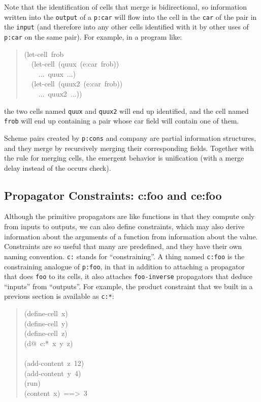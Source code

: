 \documentclass[12pt,letterpaper,english]{article}
\begin{document}
Note that the identification of cells that merge is bidirectional, so
information written into the \texttt{output} of a \texttt{p:car} will flow into
the cell in the \texttt{car} of the pair in the \texttt{input} (and therefore
into any other cells identified with it by other uses of \texttt{p:car} on
the same pair).  For example, in a program like:
\begin{quote}{\ttfamily \raggedright \noindent
(let-cell~frob~\\
~~(let-cell~(quux~(e:car~frob))~\\
~~~~...~quux~...)~\\
~~(let-cell~(quux2~(e:car~frob))~\\
~~~~...~quux2~...))
}\end{quote}
the two cells named \texttt{quux} and \texttt{quux2} will end up identified, and
the cell named \texttt{frob} will end up containing a pair whose car field
will contain one of them.

Scheme pairs created by \texttt{p:cons} and company are partial information
structures, and they merge by recursively merging their corresponding
fields.  Together with the rule for merging cells, the emergent
behavior is unification (with a merge delay instead of the occurs
check).



\hypertarget{propagator-constraints-c-foo-and-ce-foo}{}
\subsection{Propagator Constraints: c:foo and ce:foo}
\label{propagator-constraints-c-foo-and-ce-foo}

Although the primitive propagators are like functions in that they
compute only from inputs to outputs, we can also define constraints,
which may also derive information about the arguments of a function
from information about the value.  Constraints are so useful that many
are predefined, and they have their own naming convention.  \texttt{c:}
stands for ``constraining''.  A thing named \texttt{c:foo} is the
constraining analogue of \texttt{p:foo}, in that in addition to attaching a
propagator that does \texttt{foo} to its cells, it also attaches
\texttt{foo-inverse} propagators that deduce ``inputs'' from ``outputs''.  For
example, the product constraint that we built in a previous section is
available as \texttt{c:*}:
\begin{quote}{\ttfamily \raggedright \noindent
(define-cell~x)~\\
(define-cell~y)~\\
(define-cell~z)~\\
(d@~c:*~x~y~z)~\\
~\\
(add-content~z~12)~\\
(add-content~y~4)~\\
(run)~\\
(content~x)~==>~3
}\end{quote}
\end{document}
